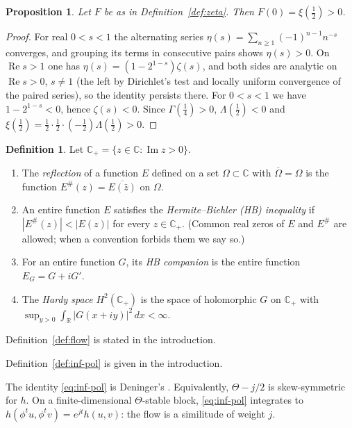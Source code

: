 \documentclass[11pt]{amsart}
\theoremstyle{plain}
\newtheorem{proposition}[theorem]{Proposition}
\theoremstyle{definition}
\newtheorem{definition}[theorem]{Definition}
\theoremstyle{remark}
\numberwithin{equation}{section}
\newcommand{\C}{\mathbb{C}}
\newcommand{\R}{\mathbb{R}}
\newcommand{\Cp}{\mathbb{C}_{+}}
\DeclareMathOperator{\Ima}{Im}
\DeclareMathOperator{\Rea}{Re}
\renewcommand{\Re}{\Rea}
\renewcommand{\Im}{\Ima}
\begin{document}
\begin{proposition}\label{prop:F0}
Let $F$ be as in Definition~\ref{def:zeta}. Then $F(0)=\xi(\tfrac12)>0$.
\end{proposition}

\begin{proof}
For real $0<s<1$ the alternating series
$\eta(s)=\sum_{n\ge1}(-1)^{n-1}n^{-s}$ converges, and grouping its terms
in consecutive pairs shows $\eta(s)>0$. On $\Re s>1$ one has
$\eta(s)=(1-2^{1-s})\zeta(s)$, and both sides are analytic on
$\Re s>0$, $s\ne1$ (the left by Dirichlet's test and locally uniform
convergence of the paired series), so the identity persists there. For
$0<s<1$ we have $1-2^{1-s}<0$, hence $\zeta(s)<0$. Since
$\Gamma(\tfrac14)>0$, $\Lambda(\tfrac12)<0$ and
$\xi(\tfrac12)=\tfrac12\cdot\tfrac12\cdot(-\tfrac12)\Lambda(\tfrac12)>0$.
\end{proof}

\begin{definition}\label{def:hb}
Let $\Cp=\{z\in\C:\Im z>0\}$.
\begin{enumerate}[label=(\alph*)]
\item The \emph{reflection} of a function $E$ defined on a set
  $\Omega\subset\C$ with $\overline\Omega=\Omega$ is the function
  $E^\#(z)=\overline{E(\bar z)}$ on $\Omega$.
\item An entire function $E$ satisfies the \emph{Hermite--Biehler (HB)
  inequality} if $|E^\#(z)|<|E(z)|$ for every $z\in\Cp$. (Common real
  zeros of $E$ and $E^\#$ are allowed; when a convention forbids them we
  say so.)
\item For an entire function $G$, its \emph{HB companion} is the entire
  function $E_G=G+iG'$.
\item The \emph{Hardy space} $H^2(\Cp)$ is the space of holomorphic $G$
  on $\Cp$ with $\sup_{y>0}\int_\R|G(x+iy)|^2\,dx<\infty$.
\end{enumerate}
\end{definition}

Definition~\ref{def:flow} is stated in the introduction.


Definition~\ref{def:inf-pol} is given in the introduction.

The identity \eqref{eq:inf-pol} is Deninger's
\cite[(7.13), p.~33]{Deninger1994Motivic}.
Equivalently, $\Theta-j/2$ is skew-symmetric for $h$. On a
finite-dimensional $\Theta$-stable block, \eqref{eq:inf-pol} integrates
to $h(\phi^tu,\phi^tv)=e^{jt}h(u,v)$: the flow is a similitude of
weight $j$.
\end{document}
